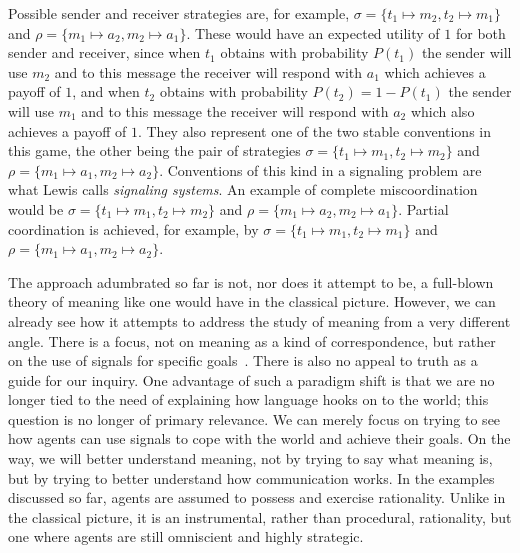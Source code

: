 \documentclass[a4paper]{article}
\begin{document}
Possible sender and receiver strategies are, for example, $\sigma = \lbrace t_1 \mapsto m_2, t_2 \mapsto m_1 \rbrace$ and $\rho = \lbrace m_1 \mapsto a_2, m_2 \mapsto a_1 \rbrace$.
These would have an expected utility of $1$ for both sender and receiver, since when $t_1$ obtains with probability $P(t_1)$ the sender will use $m_2$ and to this message the receiver will respond with $a_1$ which achieves a payoff of $1$, and when $t_2$ obtains with probability $P(t_2) = 1-P(t_1)$ the sender will use $m_1$ and to this message the receiver will respond with $a_2$ which also achieves a payoff of $1$.
They also represent one of the two stable conventions in this game, the other being the pair of strategies $\sigma = \lbrace t_1 \mapsto m_1, t_2 \mapsto m_2 \rbrace$ and $\rho = \lbrace m_1 \mapsto a_1, m_2 \mapsto a_2 \rbrace$.
Conventions of this kind in a signaling problem are what Lewis calls \emph{signaling systems}.
An example of complete miscoordination would be $\sigma = \lbrace t_1 \mapsto m_1, t_2 \mapsto m_2 \rbrace$ and $\rho = \lbrace m_1 \mapsto a_2, m_2 \mapsto a_1 \rbrace$.
Partial coordination is achieved, for example, by $\sigma = \lbrace t_1 \mapsto m_1, t_2 \mapsto m_1 \rbrace$ and $\rho = \lbrace m_1 \mapsto a_1, m_2 \mapsto a_2 \rbrace$.

The approach adumbrated so far is not, nor does it attempt to be, a full-blown theory of meaning like one would have in the classical picture.
However, we can already see how it attempts to address the study of meaning from a very different angle.
There is a focus, not on meaning as a kind of correspondence, but rather on the use of signals for specific goals~\parencite[but see][]{Hutteger:2007_Evol_Indicatives_Imperatives,Harms2010:Determining-tru,skyrms_signals_2010,Franke2013:An-adaptationis}.
There is also no appeal to truth as a guide for our inquiry.
One advantage of such a paradigm shift is that we are no longer tied to the need of explaining how language hooks on to the world; this question is no longer of primary relevance.
We can merely focus on trying to see how agents can use signals to cope with the world and achieve their goals.
On the way, we will better understand meaning, not by trying to say what meaning is, but by trying to better understand how communication works.
In the examples discussed so far, agents are assumed to possess and exercise rationality.
Unlike in the classical picture, it is an instrumental, rather than procedural, rationality, but one where agents are still omniscient and highly strategic.
\end{document}
